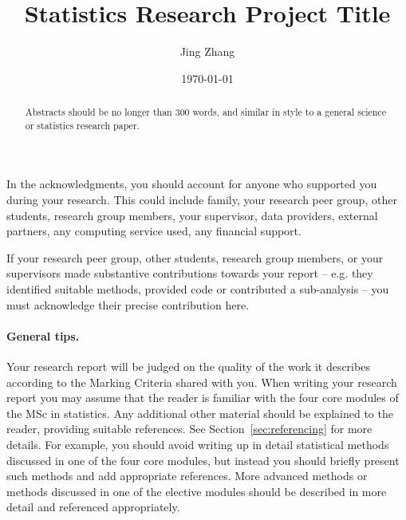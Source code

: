 \documentclass{statsmsc}
\title{Statistics Research Project Title}
\author{Jing Zhang}
\date{\today}
\begin{document}
\maketitle

\declarationdate{\today}%
\declaration 


\begin{acknowledgements}
    In the acknowledgments, you should account for anyone who supported you during your research. This could include family, your research peer group, other students, research group members, your supervisor, data providers, external partners, any computing service used, any financial support. 
    
    If your research peer group, other students, research group members, or your supervisors made substantive contributions towards your report -- e.g. they identified suitable methods, provided code or contributed a sub-analysis -- you must acknowledge their precise contribution here.
\end{acknowledgements}

\setcounter{tocdepth}{3} 
\tableofcontents
\clearpage
\mainmatter


\begin{abstract}
    Abstracts should be no longer than 300 words, and similar in style to a general science or statistics research paper.
\end{abstract}

%
%
\paragraph{General tips.} Your research report will be judged on the quality of the work it describes according to the Marking Criteria shared with you. 
When writing your research report you may assume that the reader is familiar with the four core modules of the MSc in statistics. Any additional other material should be explained to the reader, providing suitable references. See Section~\ref{sec:referencing} for more details. For example, you should avoid writing up in detail statistical methods discussed in one of the four core modules, but instead you should briefly present such methods and add appropriate references. More advanced methods or methods discussed in one of the elective modules should be described in more detail and referenced appropriately. 
\end{document}
